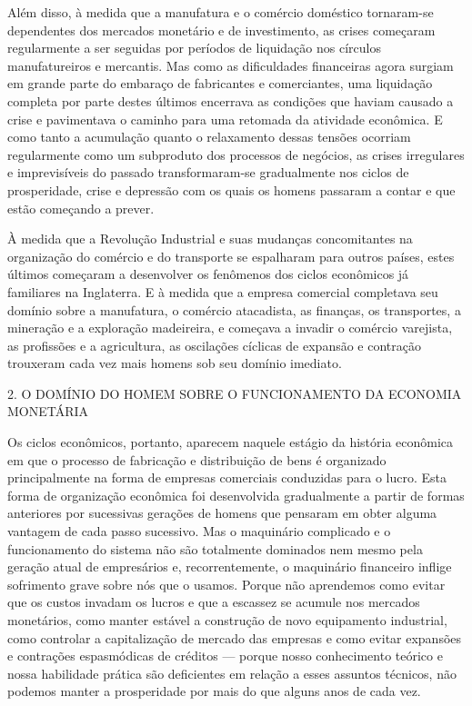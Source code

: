\documentclass[12pt]{article}
\begin{document}
Além disso, à medida que a manufatura e o comércio doméstico tornaram-se dependentes dos mercados monetário e de investimento, as crises começaram regularmente a ser seguidas por períodos de liquidação nos círculos manufatureiros e mercantis. Mas como as dificuldades financeiras agora surgiam em grande parte do embaraço de fabricantes e comerciantes, uma liquidação completa por parte destes últimos encerrava as condições que haviam causado a crise e pavimentava o caminho para uma retomada da atividade econômica. E como tanto a acumulação quanto o relaxamento dessas tensões ocorriam regularmente como um subproduto dos processos de negócios, as crises irregulares e imprevisíveis do passado transformaram-se gradualmente nos ciclos de prosperidade, crise e depressão com os quais os homens passaram a contar e que estão começando a prever.

À medida que a Revolução Industrial e suas mudanças concomitantes na organização do comércio e do transporte se espalharam para outros países, estes últimos começaram a desenvolver os fenômenos dos ciclos econômicos já familiares na Inglaterra. E à medida que a empresa comercial completava seu domínio sobre a manufatura, o comércio atacadista, as finanças, os transportes, a mineração e a exploração madeireira, e começava a invadir o comércio varejista, as profissões e a agricultura, as oscilações cíclicas de expansão e contração trouxeram cada vez mais homens sob seu domínio imediato.

2. O DOMÍNIO DO HOMEM SOBRE O FUNCIONAMENTO DA ECONOMIA MONETÁRIA

Os ciclos econômicos, portanto, aparecem naquele estágio da história econômica em que o processo de fabricação e distribuição de bens é organizado principalmente na forma de empresas comerciais conduzidas para o lucro. Esta forma de organização econômica foi desenvolvida gradualmente a partir de formas anteriores por sucessivas gerações de homens que pensaram em obter alguma vantagem de cada passo sucessivo. Mas o maquinário complicado e o funcionamento do sistema não são totalmente dominados nem mesmo pela geração atual de empresários e, recorrentemente, o maquinário financeiro inflige sofrimento grave sobre nós que o usamos. Porque não aprendemos como evitar que os custos invadam os lucros e que a escassez se acumule nos mercados monetários, como manter estável a construção de novo equipamento industrial, como controlar a capitalização de mercado das empresas e como evitar expansões e contrações espasmódicas de créditos — porque nosso conhecimento teórico e nossa habilidade prática são deficientes em relação a esses assuntos técnicos, não podemos manter a prosperidade por mais do que alguns anos de cada vez.
\end{document}
